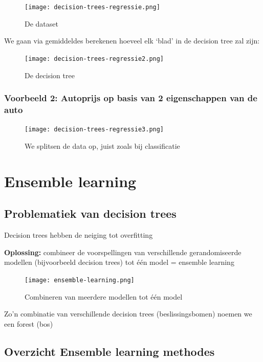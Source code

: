 \documentclass{article}
\begin{document}
\begin{figure}[H]
    \centering
    \texttt{[image: decision-trees-regressie.png]}
    \caption{De dataset}
\end{figure}

We gaan via gemiddeldes berekenen hoeveel elk `blad' in de decision tree zal zijn:

\begin{figure}[H]
    \centering
    \texttt{[image: decision-trees-regressie2.png]}
    \caption{De decision tree}
\end{figure}

\subsubsection{Voorbeeld 2: Autoprijs op basis van 2 eigenschappen van de auto}

\begin{figure}[H]
    \centering
    \texttt{[image: decision-trees-regressie3.png]}
    \caption{We splitsen de data op, juist zoals bij classificatie}
\end{figure}

\section{Ensemble learning}

\subsection{Problematiek van decision trees}

Decision trees hebben de neiging tot overfitting

\textbf{Oplossing:} combineer de voorspellingen van verschillende gerandomiseerde modellen
(bijvoorbeeld decision trees) tot één model = ensemble learning

\begin{figure}[H]
    \centering
    \texttt{[image: ensemble-learning.png]}
    \caption{Combineren van meerdere modellen tot één model}
\end{figure}

Zo'n combinatie van verschillende decision trees (beslissingsbomen) noemen we een forest (bos)

\subsection{Overzicht Ensemble learning methodes}
\end{document}

